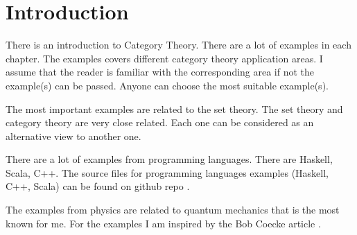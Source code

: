 \chapter*{Introduction}

There is an introduction to Category Theory. There are a lot of
examples in each chapter. The examples covers different category
theory application areas. I assume that the reader is familiar with
the corresponding area if not the example(s) can be passed. Anyone can
choose the most suitable example(s). 

The most important examples are related to the set theory. The set
theory and category theory are very close related. Each one can be
considered as an alternative view to another one.

There are a lot of examples from programming languages. There are
Haskell, Scala, C++. The source files for programming languages
examples (Haskell, C++, Scala) can be found on github repo
\cite{bib:github:ivanmurashko}.  

The examples from physics are related to quantum mechanics that is the
most known for me. For the examples I am inspired by the Bob Coecke
article \cite{bib:arxiv:Bob_Coecke_2008}.




